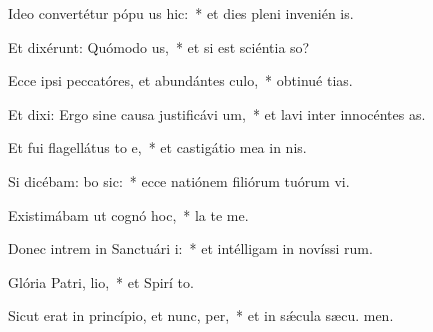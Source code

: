 \item Ideo convertétur pópu us hic:~* et dies pleni invenién  is.
\item Et dixérunt: Quómodo  us,~* et si est sciéntia  so?
\item Ecce ipsi peccatóres, et abundántes  culo,~* obtinué tias.
\item Et dixi: Ergo sine causa justificávi  um,~* et lavi inter innocéntes  as.
\item Et fui flagellátus to e,~* et castigátio mea in nis.
\item Si dicébam: bo sic:~* ecce natiónem filiórum tuórum vi.
\item Existimábam ut cognó hoc,~* la  te me.
\item Donec intrem in Sanctuári i:~* et intélligam in novíssi rum.
\item Glória Patri,  lio,~* et Spirí to.
\item Sicut erat in princípio, et nunc,  per,~* et in sǽcula sæcu. men.
